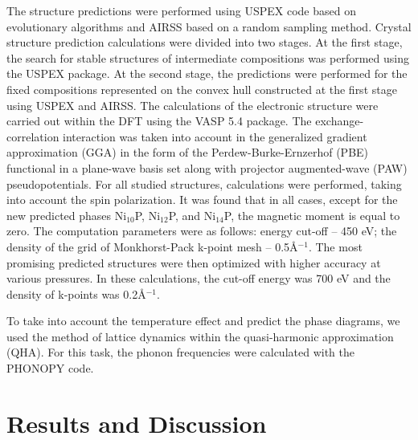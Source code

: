 \documentclass[twoside,twocolumn,9pt]{article}
\begin{document}
The structure predictions were performed using USPEX code based on evolutionary algorithms \cite{USPEX-GLASS2006713, USPEX-OGANOV-2006, USPEX-LYAKHOV-2010-1623} and AIRSS based on
a random sampling method.\cite{AIRSS-PhysRevLett.97.045504, AIRSS-Pickard_2011} 
Crystal structure prediction calculations were divided into two stages. At the first stage, the search for stable structures of intermediate compositions was performed using the USPEX package. 
At the second stage, the predictions were performed for the fixed compositions represented on the convex hull constructed at the first stage using USPEX and AIRSS.
The calculations of the electronic structure were carried out within the DFT using the VASP 5.4 package.\cite{VASP-1-PhysRevB.59.1758, VASP-2-PhysRevB.54.11169}
The exchange-correlation interaction was taken into account in the generalized  gradient approximation (GGA) in the form of the Perdew-Burke-Ernzerhof (PBE) functional \cite{PBE-PhysRevLett.78.1396} in a plane-wave basis set along with projector augmented-wave (PAW) pseudopotentials.\cite{PAW-PhysRevB.50.17953} 
For all studied structures, calculations were performed, taking into account the spin polarization. It was found that in all cases, except for the new predicted phases Ni$_{10}$P, Ni$_{12}$P, and Ni$_{14}$P, the magnetic moment is equal to zero. 
The computation parameters were as follows: energy cut-off -- 450 eV; the density of the grid of Monkhorst-Pack k-point mesh -- 0.5\AA$^{-1}$. 
The most promising predicted structures were then optimized with higher accuracy at various pressures. 
In these calculations, the cut-off energy was 700 eV and the density of k-points was 0.2\AA$^{-1}$. 

To take into account the temperature effect and predict the phase diagrams, we used the method of lattice dynamics within the quasi-harmonic approximation (QHA). 
For this task, the phonon frequencies were calculated with the PHONOPY code.\cite{phonopy}



\section{Results and Discussion}
\end{document}
